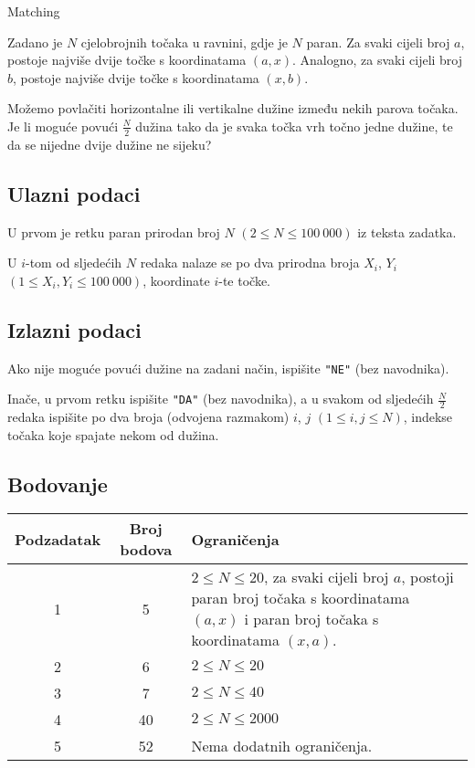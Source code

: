 \begin{statement}[
  problempoints=110,
  timelimit=1 sekunda,
  memorylimit=512 MiB,
]{Matching}

Zadano je $N$ cjelobrojnih točaka u ravnini, gdje je $N$ paran.  Za svaki
cijeli broj $a$, postoje najviše dvije točke s koordinatama $(a, x)$.
Analogno, za svaki cijeli broj $b$, postoje najviše dvije točke s
koordinatama $(x, b)$.

Možemo povlačiti horizontalne ili vertikalne dužine između nekih parova točaka.
Je li moguće povući $\frac{N}{2}$ dužina tako da je svaka točka vrh točno
jedne dužine, te da se nijedne dvije dužine ne sijeku?

\subsection*{Ulazni podaci}
U prvom je retku paran prirodan broj $N$ $(2 \le N \le 100\ 000)$ iz teksta
zadatka.

U $i$-tom od sljedećih $N$ redaka nalaze se po dva prirodna broja $X_i$, $Y_i$
$(1 \le X_i, Y_i \le 100\ 000)$, koordinate $i$-te točke.

\subsection*{Izlazni podaci}
Ako nije moguće povući dužine na zadani način, ispišite \texttt{"NE"} (bez
navodnika).

Inače, u prvom retku ispišite \texttt{"DA"} (bez navodnika), a u svakom od
sljedećih $\frac{N}{2}$ redaka ispišite po dva broja (odvojena razmakom) $i$,
$j$ $(1 \le i, j \le N)$, indekse točaka koje spajate nekom od dužina.

 \subsection*{Bodovanje}
{\renewcommand{\arraystretch}{1.4}
  \setlength{\tabcolsep}{6pt}
  \begin{tabular}{ccl}
 Podzadatak & Broj bodova & Ograničenja \\ \midrule
    1 & 5 &   \makecell[l]{$2 \le N \le 20$, za svaki cijeli broj $a$, postoji paran
              broj točaka s koordinatama $(a, x)$ \\ i paran broj točaka s koordinatama
              $(x, a)$. } \\
  2 & 6 & $2 \le N \le 20$ \\
  3 & 7 & $2 \le N \le 40$ \\
  4 & 40 & $2 \le N \le 2000$ \\
  5 & 52 & Nema dodatnih ograničenja.
\end{tabular}}


\end{statement}

